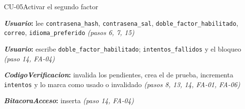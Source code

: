 \begin{fichacu}{CU-05}{Activar el segundo factor}
{\begin{cudatos}
      \item \textbf{\textit{Usuario}:} lee \texttt{contrasena\_\allowbreak{}hash}, \texttt{contrasena\_\allowbreak{}sal}, \texttt{doble\_\allowbreak{}factor\_\allowbreak{}habilitado}, \texttt{correo}, \texttt{idioma\_\allowbreak{}preferido} \textit{(pasos 6, 7, 15)}
      \item \textbf{\textit{Usuario}:} escribe \texttt{doble\_\allowbreak{}factor\_\allowbreak{}habilitado}; \texttt{intentos\_\allowbreak{}fallidos} y el bloqueo \textit{(paso 14, \mbox{FA-04})}
      \item \textbf{\textit{CodigoVerificacion}:} invalida los pendientes, crea el de prueba, incrementa \texttt{intentos} y lo marca como usado o invalidado \textit{(pasos 8, 13, 14, \mbox{FA-01}, \mbox{FA-06})}
      \item \textbf{\textit{BitacoraAcceso}:} inserta \textit{(paso 14, \mbox{FA-04})}
    \end{cudatos}} \\ \hline
\end{fichacu}
\clearpage
